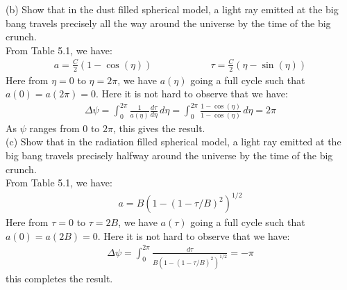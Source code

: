 \documentclass[11pt, onesided]{book}
\theoremstyle{break}
\theoremstyle{break}
\begin{document}
(b) Show that in the dust filled spherical model, a light ray emitted at the big bang travels precisely all the way around the universe by the time of the big crunch.\\

From Table 5.1, we have:
\begin{align*}
a = \frac{C}{2}(1-\cos(\eta)) \qquad\qquad\qquad \tau = \frac{C}{2}(\eta - \sin(\eta))
\end{align*}
Here from $\eta = 0$ to $\eta = 2\pi$, we have $a(\eta)$ going a full cycle such that $a(0) = a(2\pi) =0$. Here it is not hard to observe that we have:
\begin{align*}
\Delta \psi = \int_0^{2\pi} \frac{1}{a(\eta)}\frac{d\tau}{d\eta}  \,d\eta = \int_0^{2\pi} \frac{1-\cos(\eta)}{1-\cos(\eta)}\, d\eta = 2\pi
\end{align*}
As $\psi$ ranges from $0$ to $2\pi$, this gives the result. \\

(c) Show that in the radiation filled spherical model, a light ray emitted at the big bang travels precisely halfway around the universe by the time of the big crunch. \\

From Table 5.1, we have:
\begin{align*}
a = B \left( 1- (1- \tau/B)^2 \right)^{1/2}
\end{align*}
Here from $\tau = 0$ to $\tau = 2B$, we have $a(\tau)$ going a full cycle such that $a(0) = a(2B) =0$. Here it is not hard to observe that we have:
\begin{align*}
\Delta \psi  = \int_0^{2\pi} \frac{d\tau}{B \left( 1- (1- \tau/B)^2 \right)^{1/2}} = -\pi
\end{align*}
this completes the result. 
\end{document}
